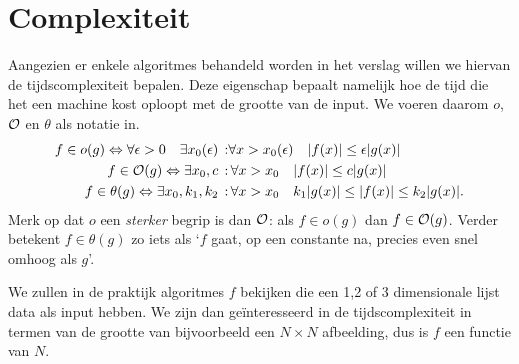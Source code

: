 \section{Complexiteit}
Aangezien er enkele algoritmes behandeld worden in het verslag willen we hiervan de tijdscomplexiteit bepalen.
Deze eigenschap bepaalt namelijk hoe de tijd die het een machine kost oploopt met de grootte van de input.
We voeren daarom $o$, $\mathcal{O}$ en $\theta$ als notatie in.
\begin{eqnarray*}
  f \in o(g) \Leftrightarrow \forall \epsilon > 0 \quad  \exists x_0(\epsilon)\,: & \forall x > x_0(\epsilon) \quad |f(x)| \leq \epsilon |g(x)|  \\
  f \in \mathcal{O}(g)     \Leftrightarrow \exists x_0,c \,:&\,\forall x>x_0 \quad|f(x)| \leq c|g(x)|  \\
  f \in \theta(g) \Leftrightarrow \exists x_0,k_1,k_2 \,:&\,\forall x>x_0 \quad k_1|g(x)| \leq |f(x)|\leq k_2|g(x)|.
\end{eqnarray*}
Merk op dat $o$ een \emph{sterker} begrip is dan $\mathcal{O}$: als $f \in o(g)$ dan $f \in \mathcal{O}(g)$. Verder betekent $f \in \theta(g)$ zo iets als `$f$ gaat, op een constante na, precies even snel omhoog als $g$'.

We zullen in de praktijk algoritmes $f$ bekijken die een 1,2 of 3 dimensionale lijst data als input hebben.
We zijn dan ge\"interesseerd in de tijdscomplexiteit in termen van de grootte van bijvoorbeeld een $N\times N$ 
afbeelding, dus is $f$ een functie van $N$.
